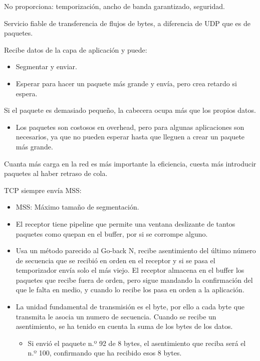 \documentclass[12pt, twoside, openright]{report} %
\begin{document}
No proporciona: temporización, ancho de banda garantizado,
seguridad.

Servicio fiable de transferencia de flujos de bytes, a diferencia de
UDP que es de paquetes.

Recibe datos de la capa de aplicación y puede:

\begin{itemize}
	\item Segmentar y enviar.
	\item Esperar para hacer un paquete más grande y envía, pero crea
	      retardo si espera.
\end{itemize}

Si el paquete es demasiado pequeño, la cabecera ocupa más que los
propios datos.

\begin{itemize}
	\item Los paquetes son costosos en overhead, pero para algunas
	      aplicaciones son necesarios, ya que no pueden esperar hasta que
	      lleguen a crear un paquete más grande.
\end{itemize}

Cuanta más carga en la red es más importante la eficiencia, cuesta
más introducir paquetes al haber retraso de cola.

TCP siempre envía MSS:

\begin{itemize}
	\item MSS: Máximo tamaño de segmentación.
	\item El receptor tiene pipeline que permite una ventana deslizante de
	      tantos paquetes como quepan en el buffer, por si se corrompe
	      alguno.
	\item Usa un método parecido al Go-back N, recibe asentimiento del
	      último número de secuencia que se recibió en orden en el receptor
	      y si se pasa el temporizador envía solo el más viejo. El receptor
	      almacena en el buffer los paquetes que recibe fuera de orden, pero
	      sigue mandando la confirmación del que le falta en medio, y cuando
	      lo recibe los pasa en orden a la aplicación.
	\item La unidad fundamental de transmisión es el byte, por ello a cada
	      byte que transmita le asocia un numero de secuencia. Cuando se
	      recibe un asentimiento, se ha tenido en cuenta la suma de los
	      bytes de los datos.

	      \begin{itemize}
		      \item Si envió el paquete n.º 92 de 8 bytes, el asentimiento que reciba
		            será el n.º 100, confirmando que ha recibido esos 8 bytes.
	      \end{itemize}
\end{itemize}
\end{document}
